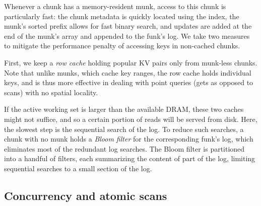 
Whenever a chunk has a memory-resident munk, access to this chunk is particularly fast:
the chunk metadata is quickly located using the index, the munk's sorted prefix allows for fast 
binary search, and updates are added at the end of the munk's array and appended to the funk's log.
We take two measures to mitigate the performance penalty of accessing keys in non-cached chunks.

First, we keep a \emph{row cache} holding popular KV pairs only from munk-less chunks. Note that unlike munks, which cache key ranges, the row
cache holds individual keys, and is thus more effective in dealing with point queries (gets as opposed to scans) with no
spatial locality.

If the active working set is larger than the available DRAM, these two caches might not suffice, and so a certain portion of reads 
will be served from disk. Here, the slowest step is the sequential search of the {log}. 
To reduce such searches, a chunk with no munk holds a \emph{Bloom filter} for the corresponding funk's {log}, 
which eliminates most of the redundant {log}  searches.
The Bloom filter is partitioned into a  handful of filters, each summarizing the 
content of part of the {log}, limiting  sequential  searches to a small section of the log.
 
 \subsection{Concurrency and atomic scans}
\label{ssec:scans}
 
